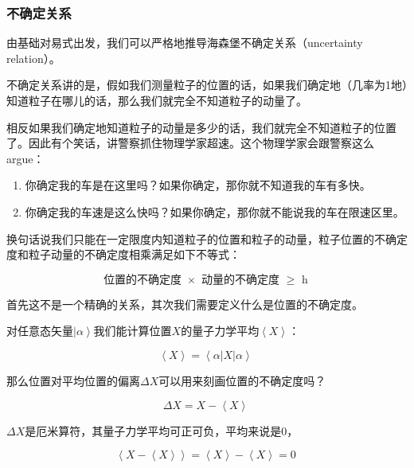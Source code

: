 \subsubsection{不确定关系}

由基础对易式出发，我们可以严格地推导海森堡不确定关系（uncertainty relation）。

不确定关系讲的是，假如我们测量粒子的位置的话，如果我们确定地（几率为1地）知道粒子在哪儿的话，那么我们就完全不知道粒子的动量了。

相反如果我们确定地知道粒子的动量是多少的话，我们就完全不知道粒子的位置了。因此有个笑话，讲警察抓住物理学家超速。这个物理学家会跟警察这么argue：

\begin{enumerate}
\item 

你确定我的车是在这里吗？如果你确定，那你就不知道我的车有多快。

\item

你确定我的车速是这么快吗？如果你确定，那你就不能说我的车在限速区里。

\end{enumerate}

换句话说我们只能在一定限度内知道粒子的位置和粒子的动量，粒子位置的不确定度和粒子动量的不确定度相乘满足如下不等式：

\begin{equation}
\text{位置的不确定度 $\times$ 动量的不确定度 $\ge $ h}~
\end{equation}

首先这不是一个精确的关系，其次我们需要定义什么是位置的不确定度。

对任意态矢量$\left| \alpha \right\rangle$我们能计算位置$X$的量子力学平均$\left\langle X \right\rangle$：

\begin{equation}
\left\langle X \right\rangle = \left\langle \alpha \right| X \left| \alpha \right\rangle~
\end{equation}

那么位置对平均位置的偏离$\Delta X$可以用来刻画位置的不确定度吗？

\begin{equation}
\Delta X = X  -  \left\langle X \right\rangle~
\end{equation}

$\Delta X$是厄米算符，其量子力学平均可正可负，平均来说是0，

\begin{equation}
\left\langle X -  \left\langle X \right\rangle \right\rangle = \left\langle X \right\rangle - \left\langle X \right\rangle = 0~
\end{equation}

